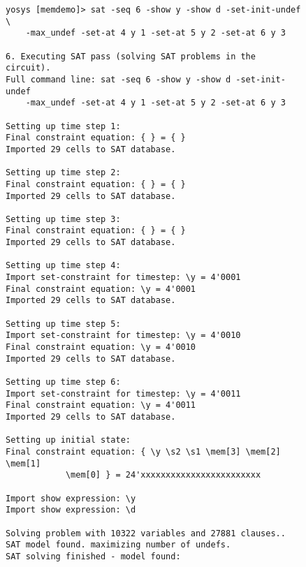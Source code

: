 \documentclass[9pt,technote,a4paper]{IEEEtran}
\begin{document}
\begin{figure}[t!]
\begin{lstlisting}[basicstyle=\ttfamily\scriptsize]
yosys [memdemo]> sat -seq 6 -show y -show d -set-init-undef \
	-max_undef -set-at 4 y 1 -set-at 5 y 2 -set-at 6 y 3

6. Executing SAT pass (solving SAT problems in the circuit).
Full command line: sat -seq 6 -show y -show d -set-init-undef
	-max_undef -set-at 4 y 1 -set-at 5 y 2 -set-at 6 y 3

Setting up time step 1:
Final constraint equation: { } = { }
Imported 29 cells to SAT database.

Setting up time step 2:
Final constraint equation: { } = { }
Imported 29 cells to SAT database.

Setting up time step 3:
Final constraint equation: { } = { }
Imported 29 cells to SAT database.

Setting up time step 4:
Import set-constraint for timestep: \y = 4'0001
Final constraint equation: \y = 4'0001
Imported 29 cells to SAT database.

Setting up time step 5:
Import set-constraint for timestep: \y = 4'0010
Final constraint equation: \y = 4'0010
Imported 29 cells to SAT database.

Setting up time step 6:
Import set-constraint for timestep: \y = 4'0011
Final constraint equation: \y = 4'0011
Imported 29 cells to SAT database.

Setting up initial state:
Final constraint equation: { \y \s2 \s1 \mem[3] \mem[2] \mem[1]
			\mem[0] } = 24'xxxxxxxxxxxxxxxxxxxxxxxx

Import show expression: \y
Import show expression: \d

Solving problem with 10322 variables and 27881 clauses..
SAT model found. maximizing number of undefs.
SAT solving finished - model found:


\end{lstlisting}
\end{figure}
\end{document}

